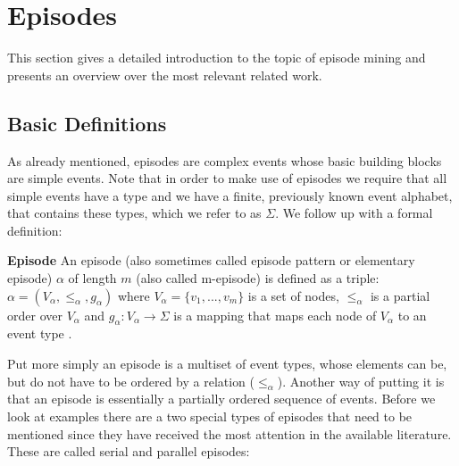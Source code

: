 




\section{Episodes}
\label{sec_episodes}
This section gives a detailed introduction to the topic of episode mining and presents an overview over the most relevant related work.

\subsection{Basic Definitions}

As already mentioned, episodes are complex events whose basic building blocks are simple events. Note that  in order to make use of episodes we require that all simple events have a type and we have a finite, previously known event alphabet, that contains these types, which we refer to as $\Sigma$. We follow up with a formal definition:

\begin{mydef}
\textbf{Episode} An episode (also sometimes called episode pattern or elementary episode) $\alpha$ of length $m$ (also called m-episode) is defined as a triple: $\alpha = (V_\alpha,{\leq}_{\alpha},g_\alpha)$ where $V_\alpha = \{v_1,...,v_m\}$ is a set of nodes, ${\leq}_{\alpha}$ is a partial order over $V_\alpha$ and $g_\alpha : V_\alpha \rightarrow \Sigma$ is a mapping that maps each node of $V_\alpha$ to an event type \cite{mannila1995discovering}.
\end{mydef}

Put more simply an episode is a multiset of event types, whose elements can be, but do not have to be ordered by a relation (${\leq}_{\alpha}$). Another way of putting it is that an episode is essentially a partially ordered sequence of events. Before we look at examples there are a two special types of episodes that need to be mentioned since they have received the most attention in the available literature. These are called serial and parallel episodes:

